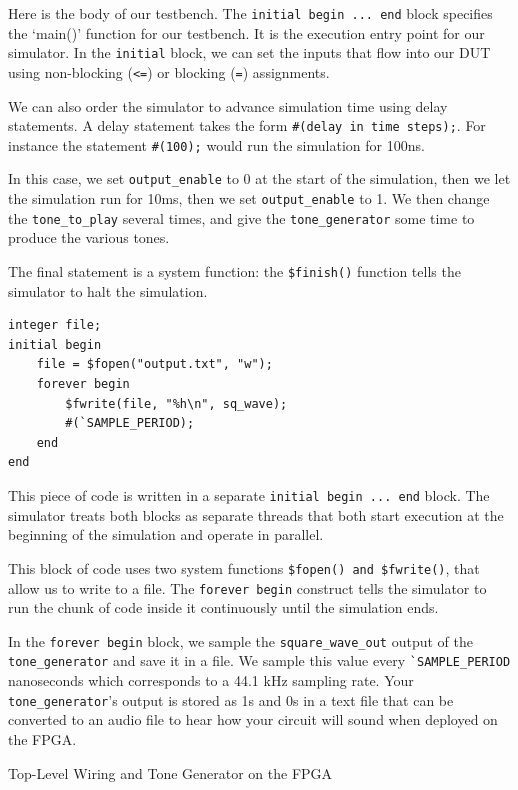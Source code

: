 \documentclass[11pt]{article}
\makeatletter
\renewcommand{\section}
{\@startsection {section}{1}{0pt}
 {-2ex}
 {1ex}
 {\bfseries\Large}}
\makeatother
\begin{document}
Here is the body of our testbench. The \verb|initial begin ... end| block specifies the `main()' function for our testbench. It is the execution entry point for our simulator. In the \verb|initial| block, we can set the inputs that flow into our DUT using non-blocking (\verb|<=|) or blocking (\verb|=|) assignments.

We can also order the simulator to advance simulation time using delay statements. A delay statement takes the form \verb|#(delay in time steps);|. For instance the statement \verb|#(100);| would run the simulation for 100ns.

In this case, we set \verb|output_enable| to 0 at the start of the simulation, then we let the simulation run for 10ms, then we set \verb|output_enable| to 1. We then change the \verb|tone_to_play| several times, and give the \verb|tone_generator| some time to produce the various tones.


The final statement is a system function: the \verb|$finish()| function tells the simulator to halt the simulation.

\begin{verbatim}
integer file;
initial begin
	file = $fopen("output.txt", "w");
	forever begin
		$fwrite(file, "%h\n", sq_wave);
		#(`SAMPLE_PERIOD);
	end
end
\end{verbatim}

This piece of code is written in a separate \verb|initial begin ... end| block. The simulator treats both blocks as separate threads that both start execution at the beginning of the simulation and operate in parallel.

This block of code uses two system functions \verb|$fopen() and $fwrite()|, that allow us to write to a file. The \verb|forever begin| construct tells the simulator to run the chunk of code inside it continuously until the simulation ends.

In the \verb|forever begin| block, we sample the \verb|square_wave_out| output of the \verb|tone_generator| and save it in a file. We sample this value every \verb|`SAMPLE_PERIOD| nanoseconds which corresponds to a 44.1 kHz sampling rate. Your \verb|tone_generator|'s output is stored as 1s and 0s in a text file that can be converted to an audio file to hear how your circuit will sound when deployed on the FPGA.

\section{Top-Level Wiring and Tone Generator on the FPGA}
\end{document}
